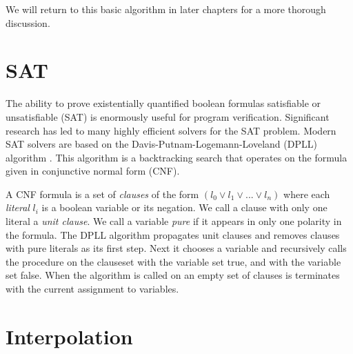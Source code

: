 We will return to this basic algorithm in later chapters for a more thorough discussion.

\section{SAT}

The ability to prove existentially quantified boolean formulas satisfiable or
unsatisfiable (SAT) is enormously useful for program verification. Significant
research has led to many highly efficient solvers for the SAT problem. Modern
SAT solvers are based on the Davis-Putnam-Logemann-Loveland (DPLL) algorithm
\cite{Davis60, Davis62}. This algorithm is a backtracking search that operates
on the formula given in conjunctive normal form (CNF).

A CNF formula is a set of \emph{clauses} of the form $(l_0 \lor l_1 \lor ...
\lor l_n)$ where each \emph{literal} $l_i$ is a boolean variable or its
negation. We call a clause with only one literal a \emph{unit clause}. We call
a variable \emph{pure} if it appears in only one polarity in the formula. The
DPLL algorithm propagates unit clauses and removes clauses with pure literals
as its first step. Next it chooses a variable and recursively calls the
procedure on the clauseset with the variable set true, and with the variable
set false. When the algorithm is called on an empty set of clauses is
terminates with the current assignment to variables. 

\section{Interpolation}
